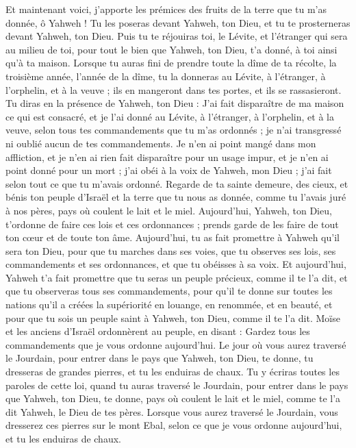 \begin{multicols}{2}
Et maintenant voici, j'apporte les prémices des fruits de la terre que tu m'as donnée, ô Yahweh ! Tu les poseras devant Yahweh, ton Dieu, et tu te prosterneras devant Yahweh, ton Dieu.
Puis tu te réjouiras toi, le Lévite, et l’étranger qui sera au milieu de toi, pour tout le bien que Yahweh, ton Dieu, t'a donné, à toi ainsi qu’à ta maison.
Lorsque tu auras fini de prendre toute la dîme de ta récolte, la troisième année, l'année de la dîme, tu la donneras au Lévite, à l'étranger, à l'orphelin, et à la veuve ; ils en mangeront dans tes portes, et ils se rassasieront.
Tu diras en la présence de Yahweh, ton Dieu : J'ai fait disparaître de ma maison ce qui est consacré, et je l'ai donné au Lévite, à l'étranger, à l'orphelin, et à la veuve, selon tous tes commandements que tu m'as ordonnés ; je n'ai transgressé ni oublié aucun de tes commandements.
Je n'en ai point mangé dans mon affliction, et je n'en ai rien fait disparaître pour un usage impur, et je n'en ai point donné pour un mort ; j'ai obéi à la voix de Yahweh, mon Dieu ; j'ai fait selon tout ce que tu m'avais ordonné.
Regarde de ta sainte demeure, des cieux, et bénis ton peuple d'Israël et la terre que tu nous as donnée, comme tu l’avais juré à nos pères, pays où coulent le lait et le miel.
Aujourd'hui, Yahweh, ton Dieu, t’ordonne de faire ces lois et ces ordonnances ; prends garde de les faire de tout ton cœur et de toute ton âme.
Aujourd’hui, tu as fait promettre à Yahweh qu'il sera ton Dieu, pour que tu marches dans ses voies, que tu observes ses lois, ses commandements et ses ordonnances, et que tu obéisses à sa voix.
Et aujourd’hui, Yahweh t’a fait promettre que tu seras un peuple précieux, comme il te l’a dit, et que tu observeras tous ses commandements,
pour qu’il te donne sur toutes les nations qu'il a créées la supériorité en louange, en renommée, et en beauté, et pour que tu sois un peuple saint à Yahweh, ton Dieu, comme il te l’a dit.
\VerseOne{}Moïse et les anciens d'Israël ordonnèrent au peuple, en disant : Gardez tous les commandements que je vous ordonne aujourd'hui.
Le jour où vous aurez traversé le Jourdain, pour entrer dans le pays que Yahweh, ton Dieu, te donne, tu dresseras de grandes pierres, et tu les enduiras de chaux.
Tu y écriras toutes les paroles de cette loi, quand tu auras traversé le Jourdain, pour entrer dans le pays que Yahweh, ton Dieu, te donne, pays où coulent le lait et le miel, comme te l’a dit Yahweh, le Dieu de tes pères.
Lorsque vous aurez traversé le Jourdain, vous dresserez ces pierres sur le mont Ebal, selon ce que je vous ordonne aujourd'hui, et tu les enduiras de chaux.

\end{multicols}
